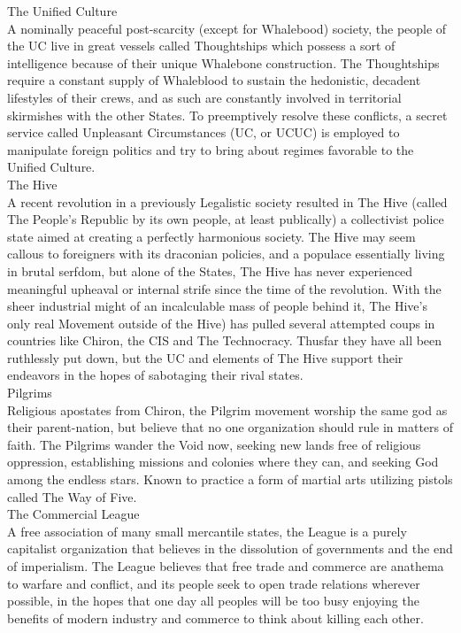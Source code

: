 \documentclass[a4paper, twocolumn, openany]{book}
\begin{document}
{	{\large The Unified Culture\\}
	A nominally peaceful post-scarcity (except for Whalebood) society, the people of the UC live in
	great vessels called Thoughtships which possess a sort of intelligence because of their unique
	Whalebone construction. The Thoughtships require a constant supply of Whaleblood to sustain
	the hedonistic, decadent lifestyles of their crews, and as such are constantly involved in
	territorial skirmishes with the other States. To preemptively resolve these conflicts, a secret
	service called Unpleasant Circumstances (UC, or UCUC) is employed to manipulate foreign
	politics and try to bring about regimes favorable to the Unified Culture.\\

	{\large The Hive\\}
	A recent revolution in a previously Legalistic society resulted in The Hive (called The People’s
	Republic by its own people, at least publically) a collectivist police state aimed at creating a
	perfectly harmonious society. The Hive may seem callous to foreigners with its draconian
	policies, and a populace essentially living in brutal serfdom, but alone of the States, The Hive
	has never experienced meaningful upheaval or internal strife since the time of the revolution.
	With the sheer industrial might of an incalculable mass of people behind it, The Hive’s only real
	Movement outside of the Hive) has pulled several attempted coups in countries like Chiron, the
	CIS and The Technocracy. Thusfar they have all been ruthlessly put down, but the UC and
	elements of The Hive support their endeavors in the hopes of sabotaging their rival states.\\

	{\large Pilgrims\\}
	Religious apostates from Chiron, the Pilgrim movement worship the same god as their
	parent-nation, but believe that no one organization should rule in matters of faith. The Pilgrims
	wander the Void now, seeking new lands free of religious oppression, establishing missions and
	colonies where they can, and seeking God among the endless stars. Known to practice a form
	of martial arts utilizing pistols called The Way of Five.\\

	{\large The Commercial League\\}
	A free association of many small mercantile states, the League is a purely capitalist organization
	that believes in the dissolution of governments and the end of imperialism. The League believes
	that free trade and commerce are anathema to warfare and conflict, and its people seek to open
	trade relations wherever possible, in the hopes that one day all peoples will be too busy
	enjoying the benefits of modern industry and commerce to think about killing each other.\\

}
\end{document}
